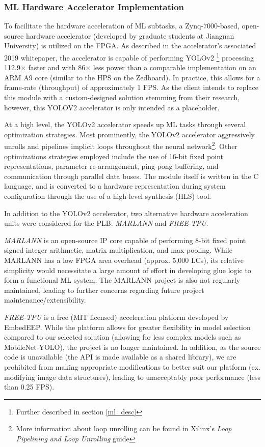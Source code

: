 \subsubsection{ML Hardware Accelerator Implementation}\label{ml_accel}
To facilitate the hardware acceleration of ML subtasks, a Zynq-7000-based, open-source hardware accelerator \cite{yolov2accel} (developed by graduate students at Jiangnan University) is utilized on the FPGA. As described in the accelerator's associated 2019 whitepaper\cite{yolov2unipaper}, the accelerator is capable of performing YOLOv2 \footnote{Further described in section \ref{ml_desc}} processing 112.9$\times$ faster and with 86$\times$ less power than a comparable implementation on an ARM A9 core (similar to the HPS on the Zedboard). In practice, this allows for a frame-rate (throughput) of approximately 1 FPS. As the client intends to replace this module with a custom-designed solution stemming from their research, however, this YOLOV2 accelerator is only intended as a placeholder.

At a high level, the YOLOv2 accelerator speeds up ML tasks through several optimization strategies. Most prominently, the YOLOv2 accelerator aggressively unrolls and pipelines implicit loops throughout the neural network\footnote{More information about loop unrolling can be found in Xilinx's \textit{Loop Pipelining and Loop Unrolling} guide\cite{xilinx}}. Other optimizations strategies employed include the use of 16-bit fixed point representations, parameter re-arrangement, ping-pong buffering\cite{pingpong}, and communication through parallel data buses. The module itself is written in the C language, and is converted to a hardware representation during system configuration through the use of a high-level synthesis (HLS) tool. 

In addition to the YOLOv2 accelerator, two alternative hardware acceleration units were considered for the PLB: \textit{MARLANN}\cite{marlann} and \textit{FREE-TPU}\cite{freetpu}. 

\textit{MARLANN} is an open-source IP core capable of performing 8-bit fixed point signed integer arithmetic, matrix multiplication, and max-pooling. While MARLANN has a low FPGA area overhead (approx. 5,000 LCs), its relative simplicity would necessitate a large amount of effort in developing glue logic to form a functional ML system. The MARLANN project is also not regularly maintained, leading to further concerns regarding future project maintenance/extensibility.

\textit{FREE-TPU} is a free (MIT licensed) acceleration platform developed by EmbedEEP. While the platform allows for greater flexibility in model selection compared to our selected solution (allowing for less complex models such as MobileNet-YOLO), the project is no longer maintained. In addition, as the source code is unavailable (the API is made available as a shared library), we are prohibited from making appropriate modifications to better suit our platform (ex. modifying image data structures), leading to unacceptably poor performance (less than 0.25 FPS).

